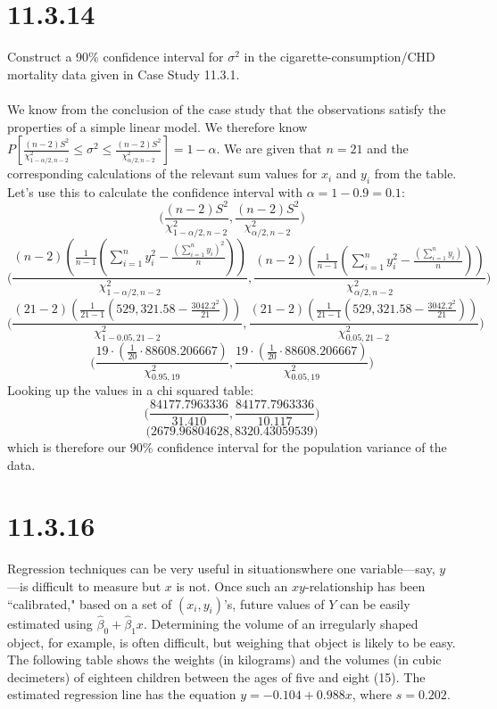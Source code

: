 \documentclass{article}
\begin{document}
{\section*{11.3.14}
Construct a 90\% confidence interval for \(\sigma^2\) in the cigarette-consumption/CHD mortality data given in Case Study 11.3.1.
\\
\\
We know from the conclusion of the case study that the observations satisfy the properties of a simple linear model. We therefore know \(P[\frac{(n-2)S^2}{\chi^2_{1-\alpha / 2, n-2}} \leq \sigma^2 \leq \frac{(n-2)S^2}{\chi^2_{\alpha / 2, n-2}}] = 1 - \alpha\). We are given that \(n=21\) and the corresponding calculations of the relevant sum values for \(x_i\) and \(y_i\) from the table. Let's use this to calculate the confidence interval with \(\alpha = 1 - 0.9 = 0.1\): 
\[
\big(\frac{(n-2)S^2}{\chi^2_{1-\alpha / 2, n-2}}, \frac{(n-2)S^2}{\chi^2_{\alpha / 2, n-2}}\big)
\]
\[
\big(\frac{(n-2)(\frac{1}{n-1}(\sum_{i=1}^{n}y_i^2 - \frac{(\sum_{i=1}^{n}y_i)^2}{n}))}{\chi^2_{1-\alpha / 2, n-2}}, \frac{(n-2)(\frac{1}{n-1}(\sum_{i=1}^{n}y_i^2 - \frac{(\sum_{i=1}^{n}y_i)}{n}))}{\chi^2_{\alpha / 2, n-2}}\big)
\]
\[
\big(\frac{(21-2)(\frac{1}{21-1} (529,321.58 - \frac{3042.2^2}{21}))}{\chi^2_{1 - 0.05, 21-2}}, \frac{(21-2)(\frac{1}{21-1} (529,321.58 - \frac{3042.2^2}{21}))}{\chi^2_{0.05, 21-2}}\big)
\]
\[
\big(\frac{19 \cdot (\frac{1}{20} \cdot 88608.206667)}{\chi^2_{0.95, 19}}, \frac{19 \cdot (\frac{1}{20} \cdot 88608.206667)}{\chi^2_{0.05, 19}}\big)
\]
Looking up the values in a chi squared table:
\[
\big(\frac{84177.7963336}{31.410}, \frac{84177.7963336}{10.117}\big)
\]
\[
\big(2679.96804628, 8320.43059539 \big)
\]
which is therefore our 90\% confidence interval for the population variance of the data.

\section*{11.3.16}
Regression techniques can be very useful in situationswhere one variable—say, \(y\)—is difficult to measure but \(x\) is not. Once such an \(xy\)-relationship has been “calibrated," based on a set of \((x_i, y_i)\)'s, future values of \(Y\) can be easily estimated using \(\hat{\beta}_0 + \hat{\beta}_1x\). Determining the volume of an irregularly shaped object, for example, is often difficult, but weighing that object is likely to be easy. The following table shows the weights (in kilograms) and the volumes (in cubic decimeters) of eighteen children between the ages of five and eight (15). The estimated regression line has the equation \(y = -0.104+0.988x\), where \(s = 0.202\).

}
\end{document}

